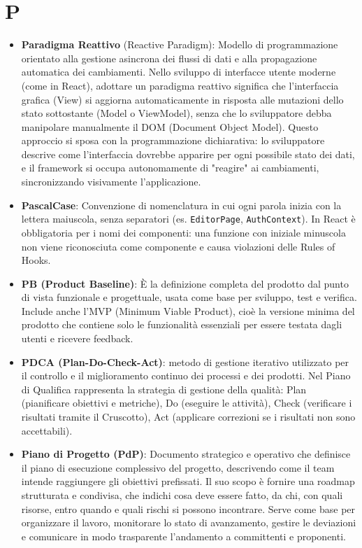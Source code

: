 \documentclass[11pt,a4paper]{article}
\begin{document}
\newpage

\section*{P}
\begin{itemize}
\item \textbf{Paradigma Reattivo} (Reactive Paradigm): Modello di programmazione orientato alla gestione asincrona dei flussi di dati e alla propagazione automatica dei cambiamenti. Nello sviluppo di interfacce utente moderne (come in React), adottare un paradigma reattivo significa che l'interfaccia grafica (View) si aggiorna automaticamente in risposta alle mutazioni dello stato sottostante (Model o ViewModel), senza che lo sviluppatore debba manipolare manualmente il DOM (Document Object Model). Questo approccio si sposa con la programmazione dichiarativa: lo sviluppatore descrive come l'interfaccia dovrebbe apparire per ogni possibile stato dei dati, e il framework si occupa autonomamente di "reagire" ai cambiamenti, sincronizzando visivamente l'applicazione.

\item \textbf{PascalCase}: Convenzione di nomenclatura in cui ogni parola inizia con la lettera maiuscola, senza separatori (es. \texttt{EditorPage}, \texttt{AuthContext}). In React è obbligatoria per i nomi dei componenti: una funzione con iniziale minuscola non viene riconosciuta come componente e causa violazioni delle Rules of Hooks.

\item \textbf{PB (Product Baseline)}: È la definizione completa del prodotto dal punto di vista funzionale e progettuale, usata come base per sviluppo, test e verifica. Include anche l’MVP (Minimum Viable Product), cioè la versione minima del prodotto che contiene solo le funzionalità essenziali per essere testata dagli utenti e ricevere feedback.

\item \textbf{PDCA (Plan-Do-Check-Act)}: metodo di gestione iterativo utilizzato per il controllo e il miglioramento continuo dei processi e dei prodotti. Nel Piano di Qualifica rappresenta la strategia di gestione della qualità: Plan (pianificare obiettivi e metriche), Do (eseguire le attività), Check (verificare i risultati tramite il Cruscotto), Act (applicare correzioni se i risultati non sono accettabili).

\item \textbf{Piano di Progetto (PdP)}: Documento strategico e operativo che definisce il piano di esecuzione complessivo del progetto, descrivendo come il team intende raggiungere gli obiettivi prefissati. Il suo scopo è fornire una roadmap strutturata e condivisa, che indichi cosa deve essere fatto, da chi, con quali risorse, entro quando e quali rischi si possono incontrare. Serve come base per organizzare il lavoro, monitorare lo stato di avanzamento, gestire le deviazioni e comunicare in modo trasparente l’andamento a committenti e proponenti.


\end{itemize}
\end{document}
